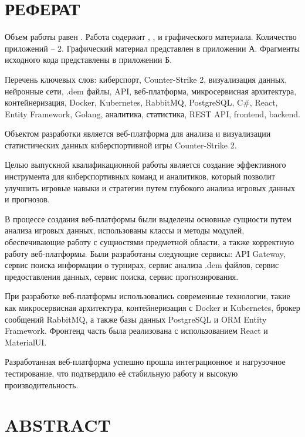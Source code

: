 \newsection
\section*{РЕФЕРАТ}

Объем работы равен . Работа содержит , ,  и  графического материала. Количество приложений – 2. Графический материал представлен в приложении А. Фрагменты исходного кода представлены в приложении Б.

Перечень ключевых слов: киберспорт, Counter-Strike 2, визуализация данных, нейронные сети, .dem файлы, API, веб-платформа, микросервисная архитектура, контейнеризация, Docker, Kubernetes, RabbitMQ, PostgreSQL, C\#, React, Entity Framework, Golang, аналитика, статистика, REST API, frontend, backend.

Объектом разработки является веб-платформа для анализа и визуализации статистических данных киберспортивной игры Counter-Strike 2.

Целью выпускной квалификационной работы является создание эффективного инструмента для киберспортивных команд и аналитиков, который позволит улучшить игровые навыки и стратегии путем глубокого анализа игровых данных и прогнозов.

В процессе создания веб-платформы были выделены основные сущности путем анализа игровых данных, использованы классы и методы модулей, обеспечивающие работу с сущностями предметной области, а также корректную работу веб-платформы. Были разработаны следующие сервисы: API Gateway, сервис поиска информации о турнирах, сервис анализа .dem файлов, сервис предоставления данных, сервис поиска, сервис прогнозирования.

При разработке веб-платформы использовались современные технологии, такие как микросервисная архитектура, контейнеризация с Docker и Kubernetes, брокер сообщений RabbitMQ, а также базы данных PostgreSQL и ORM Entity Framework. Фронтенд часть была реализована с использованием React и MaterialUI.

Разработанная веб-платформа успешно прошла интеграционное и нагрузочное тестирование, что подтвердило её стабильную работу и высокую производительность.
\newpage
{}
\section*{ABSTRACT}
  

